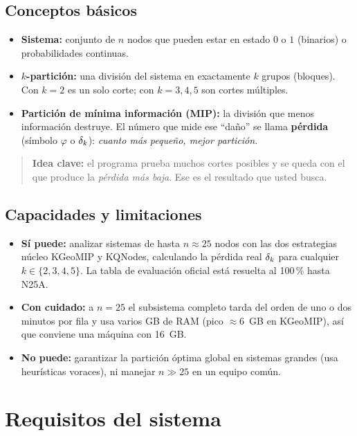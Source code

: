 \documentclass[11pt,letterpaper]{article}
\begin{document}
\subsection{Conceptos básicos}
\begin{itemize}
	\item \textbf{Sistema:} conjunto de $n$ nodos que pueden estar en estado $0$ o $1$ (binarios) o probabilidades continuas.
	\item \textbf{$k$-partición:} una división del sistema en exactamente $k$ grupos
	      (bloques). Con $k=2$ es un solo corte; con $k=3,4,5$ son cortes múltiples.
	\item \textbf{Partición de mínima información (MIP):} la división que menos
	      información destruye. El número que mide ese ``daño'' se llama \textbf{pérdida}
	      (símbolo $\varphi$ o $\delta_k$): \emph{cuanto más pequeño, mejor partición}.
\end{itemize}

\begin{quote}\small
	\textbf{Idea clave:} el programa prueba muchos cortes posibles y se queda con el
	que produce la \emph{pérdida más baja}. Ese es el resultado que usted busca.
\end{quote}

\subsection{Capacidades y limitaciones}
\begin{itemize}
	\item \textbf{Sí puede:} analizar sistemas de hasta $n \approx 25$ nodos con las
	      dos estrategias núcleo KGeoMIP y KQNodes, calculando la pérdida real $\delta_k$ para
	      cualquier $k\in\{2,3,4,5\}$. La tabla de evaluación oficial está resuelta al
	      100\,\% hasta N25A.
	\item \textbf{Con cuidado:} a $n=25$ el subsistema completo tarda del orden de uno
	      o dos minutos por fila y usa varios GB de RAM (pico $\approx 6$~GB en KGeoMIP),
	      así que conviene una máquina con 16~GB.
	\item \textbf{No puede:} garantizar la partición óptima global en sistemas
	      grandes (usa heurísticas voraces), ni manejar $n \gg 25$ en un equipo común.
\end{itemize}

\section{Requisitos del sistema}
\end{document}
